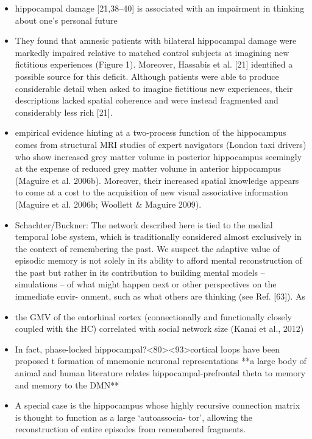 \documentclass{article} %
\begin{document}
\begin{itemize}
\begin{itemize}
\item
hippocampal damage [21,38–40] is associated with an impairment in thinking about one’s personal future

\item
They found that amnesic patients with bilateral hippocampal damage were markedly impaired relative to matched control subjects at imagining new fictitious experiences (Figure 1). Moreover, Hassabis et al. [21] identified a possible source for this deficit. Although patients were able to produce considerable detail when asked to imagine fictitious new experiences, their descriptions lacked spatial coherence and were instead fragmented and considerably less rich [21].

\item
 empirical evidence hinting at a two-process function of the hippocampus comes from structural MRI studies of expert navigators (London taxi drivers) who show increased grey matter volume in posterior hippocampus seemingly at the expense of reduced grey matter volume in anterior hippocampus (Maguire et al. 2006b). Moreover, their increased spatial knowledge appears to come at a cost to the acquisition of new visual associative information (Maguire et al. 2006b; Woollett & Maguire 2009). 

\item
Schachter/Buckner:
The network described here is tied to the medial temporal lobe system, which is traditionally considered almost exclusively in the context of remembering the past. We suspect the adaptive value of
episodic memory is not solely in its ability to afford mental reconstruction of the past but rather in its contribution to building mental models – simulations – of what might happen next or other perspectives on the immediate envir- onment, such as what others are thinking (see Ref. [63]). As

\item
the GMV of the entorhinal cortex (connectionally and functionally closely coupled with the HC) correlated with social network size (Kanai et al., 2012)


\item 
In fact, phase-locked hippocampal?<80><93>cortical loops have been proposed t
formation of mnemonic neuronal representations
**a large body of animal and human literature relates
hippocampal-prefrontal theta to memory and memory to the DMN**


\item 
A special case is the hippocampus whose highly recursive connection matrix is thought to function as a large ‘autoassocia- tor’, allowing the reconstruction of entire episodes from remembered fragments.


\end{itemize}
\end{itemize}
\end{document}
